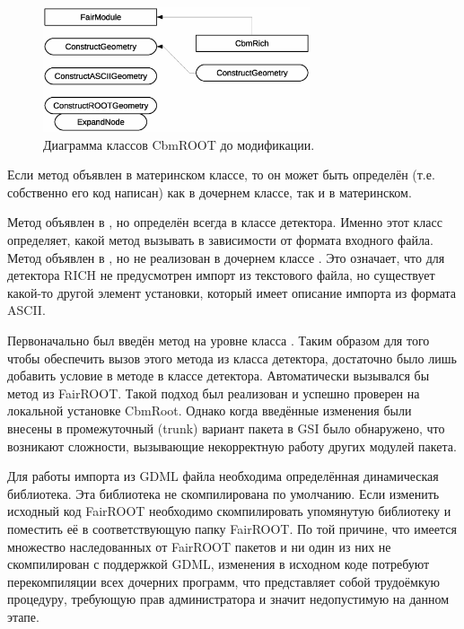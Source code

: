 \begin{figure}[H]
\centering
\includegraphics[width=0.7\textwidth]{pictures/FairModule_classes_before.eps}
\caption{Диаграмма классов CbmROOT до модификации.}
\label{fig:classesBefore}
\end{figure}

Если метод объявлен в материнском классе, то он может быть определён (т.е. собственно его код написан) как в дочернем классе, так и в материнском.

Метод  объявлен в , но определён всегда в классе детектора. Именно этот класс определяет, какой метод вызывать в зависимости от формата входного файла. Метод  объявлен в , но не реализован в дочернем классе . Это означает, что для детектора RICH не предусмотрен импорт из текстового файла, но существует какой-то другой элемент установки, который имеет описание импорта из формата ASCII.

Первоначально был введён метод  на уровне класса . Таким образом для того чтобы обеспечить вызов этого метода из класса детектора, достаточно было лишь добавить условие в методе  в классе детектора. Автоматически вызывался бы метод из FairROOT. Такой подход был реализован и успешно проверен на локальной установке CbmRoot. Однако когда введённые изменения были внесены в промежуточный (trunk) вариант пакета в GSI было обнаружено, что возникают сложности, вызывающие некорректную работу других модулей пакета.

Для работы импорта из GDML файла необходима определённая динамическая библиотека. Эта библиотека не скомпилирована по умолчанию. Если изменить исходный код FairROOT необходимо скомпилировать упомянутую библиотеку и поместить её в соответствующую папку FairROOT. По той причине, что имеется множество наследованных от FairROOT пакетов и ни один из них не скомпилирован с поддержкой GDML, изменения в исходном коде потребуют перекомпиляции всех дочерних программ, что представляет собой трудоёмкую процедуру, требующую прав администратора и значит недопустимую на данном этапе.

